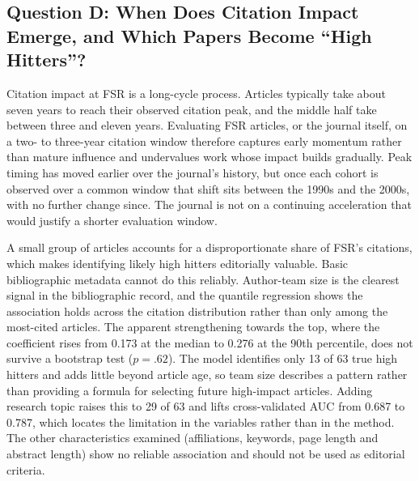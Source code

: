 \documentclass[11pt,a4paper]{article}
\begin{document}
\subsection{Question D: When Does Citation Impact Emerge, and Which Papers Become ``High Hitters''?}\label{question-d-when-does-citation-impact-emerge-and-which-papers-become-high-hitters-1}

Citation impact at FSR is a long-cycle process. Articles typically take about seven years to reach their observed citation peak, and the middle half take between three and eleven years. Evaluating FSR articles, or the journal itself, on a two- to three-year citation window therefore captures early momentum rather than mature influence and undervalues work whose impact builds gradually. Peak timing has moved earlier over the journal's history, but once each cohort is observed over a common window that shift sits between the 1990s and the 2000s, with no further change since. The journal is not on a continuing acceleration that would justify a shorter evaluation window.

A small group of articles accounts for a disproportionate share of FSR's citations, which makes identifying likely high hitters editorially valuable. Basic bibliographic metadata cannot do this reliably. Author-team size is the clearest signal in the bibliographic record, and the quantile regression shows the association holds across the citation distribution rather than only among the most-cited articles. The apparent strengthening towards the top, where the coefficient rises from 0.173 at the median to 0.276 at the 90th percentile, does not survive a bootstrap test ($p = .62$). The model identifies only 13 of 63 true high hitters and adds little beyond article age, so team size describes a pattern rather than providing a formula for selecting future high-impact articles. Adding research topic raises this to 29 of 63 and lifts cross-validated AUC from 0.687 to 0.787, which locates the limitation in the variables rather than in the method. The other characteristics examined (affiliations, keywords, page length and abstract length) show no reliable association and should not be used as editorial criteria.
\end{document}
